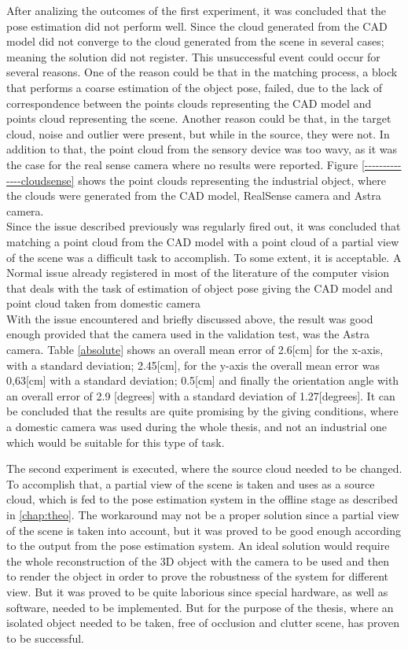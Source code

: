 After analizing the outcomes of the first experiment, it was concluded that the pose estimation did not perform well. Since the cloud generated from the CAD model did not converge to the cloud generated from the scene in several cases; meaning the solution did not register. This unsuccessful event could occur for several reasons. One of the reason could be that in the matching process, a block that performs a coarse estimation of the object pose, failed, due to the lack of correspondence between the points clouds representing the CAD model and points cloud representing the scene. Another reason could be that, in the target cloud, noise and outlier were present, but while in the source, they were not. In addition to that, the point cloud from the sensory device was too wavy, as it was the case for the real sense camera where no results were reported. Figure \ref{--------------cloudsense} shows the point clouds representing the industrial object, where the clouds were generated from the CAD model, RealSense camera and Astra camera.\\
Since the issue described previously was regularly fired out, it was concluded that matching a point cloud from the CAD model with a point cloud of a partial view of the scene was a difficult task to accomplish. To some extent, it is acceptable. A Normal issue already registered in most of the literature of the computer vision that deals with the task of estimation of object pose giving the CAD model and point cloud taken from domestic camera\\ 
With the issue encountered and briefly discussed above, the result was good enough provided that the camera used in the validation test, was the Astra camera. Table \ref{absolute}  shows an overall mean error of 2.6[cm] for the x-axis, with a standard deviation; 2.45[cm], for the y-axis the overall mean error was 0,63[cm] with a standard deviation; 0.5[cm] and finally the orientation angle with an overall error of 2.9 [degrees] with a standard deviation of 1.27[degrees]. It can be concluded that the results are quite promising by the giving conditions, where a domestic camera was used during the whole thesis, and not an industrial one which would be suitable for this type of task. 

The second experiment is executed, where the source cloud needed to be changed. To accomplish that, a partial view of the scene is taken and uses as a source cloud, which is fed to the pose estimation system in the offline stage as described in \ref{chap:theo}. The workaround may not be a proper solution since a partial view of the scene is taken into account, but it was proved to be good enough according to the output from the pose estimation system. An ideal solution would require the whole reconstruction of the 3D object with the camera to be used and then to render the object in order to prove the robustness of the system for different view. But it was proved to be quite laborious since special hardware, as well as software, needed to be implemented. But for the purpose of the thesis, where an isolated object needed to be taken, free of occlusion and clutter scene, has proven to be successful.

